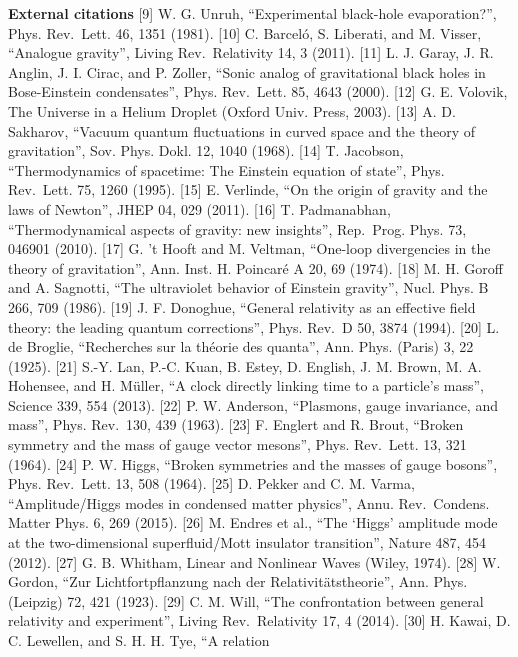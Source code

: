 \documentclass[
]{article}
\begin{document}
\textbf{External citations} {[}9{]} W. G. Unruh, ``Experimental
black-hole evaporation?'', Phys. Rev.~Lett. 46, 1351 (1981). {[}10{]} C.
Barceló, S. Liberati, and M. Visser, ``Analogue gravity'', Living
Rev.~Relativity 14, 3 (2011). {[}11{]} L. J. Garay, J. R. Anglin, J. I.
Cirac, and P. Zoller, ``Sonic analog of gravitational black holes in
Bose-Einstein condensates'', Phys. Rev.~Lett. 85, 4643 (2000). {[}12{]}
G. E. Volovik, The Universe in a Helium Droplet (Oxford Univ. Press,
2003). {[}13{]} A. D. Sakharov, ``Vacuum quantum fluctuations in curved
space and the theory of gravitation'', Sov. Phys. Dokl. 12, 1040 (1968).
{[}14{]} T. Jacobson, ``Thermodynamics of spacetime: The Einstein
equation of state'', Phys. Rev.~Lett. 75, 1260 (1995). {[}15{]} E.
Verlinde, ``On the origin of gravity and the laws of Newton'', JHEP 04,
029 (2011). {[}16{]} T. Padmanabhan, ``Thermodynamical aspects of
gravity: new insights'', Rep.~Prog. Phys. 73, 046901 (2010). {[}17{]} G.
't Hooft and M. Veltman, ``One-loop divergencies in the theory of
gravitation'', Ann. Inst. H. Poincaré A 20, 69 (1974). {[}18{]} M. H.
Goroff and A. Sagnotti, ``The ultraviolet behavior of Einstein
gravity'', Nucl. Phys. B 266, 709 (1986). {[}19{]} J. F. Donoghue,
``General relativity as an effective field theory: the leading quantum
corrections'', Phys. Rev.~D 50, 3874 (1994). {[}20{]} L. de Broglie,
``Recherches sur la théorie des quanta'', Ann. Phys. (Paris) 3, 22
(1925). {[}21{]} S.-Y. Lan, P.-C. Kuan, B. Estey, D. English, J. M.
Brown, M. A. Hohensee, and H. Müller, ``A clock directly linking time to
a particle's mass'', Science 339, 554 (2013). {[}22{]} P. W. Anderson,
``Plasmons, gauge invariance, and mass'', Phys. Rev.~130, 439 (1963).
{[}23{]} F. Englert and R. Brout, ``Broken symmetry and the mass of
gauge vector mesons'', Phys. Rev.~Lett. 13, 321 (1964). {[}24{]} P. W.
Higgs, ``Broken symmetries and the masses of gauge bosons'', Phys.
Rev.~Lett. 13, 508 (1964). {[}25{]} D. Pekker and C. M. Varma,
``Amplitude/Higgs modes in condensed matter physics'', Annu.
Rev.~Condens. Matter Phys. 6, 269 (2015). {[}26{]} M. Endres et al.,
``The `Higgs' amplitude mode at the two-dimensional superfluid/Mott
insulator transition'', Nature 487, 454 (2012). {[}27{]} G. B. Whitham,
Linear and Nonlinear Waves (Wiley, 1974). {[}28{]} W. Gordon, ``Zur
Lichtfortpflanzung nach der Relativitätstheorie'', Ann. Phys. (Leipzig)
72, 421 (1923). {[}29{]} C. M. Will, ``The confrontation between general
relativity and experiment'', Living Rev.~Relativity 17, 4 (2014).
{[}30{]} H. Kawai, D. C. Lewellen, and S. H. H. Tye, ``A relation
\end{document}
